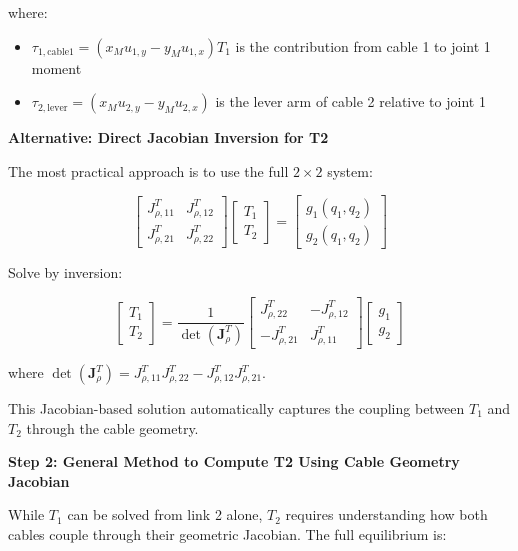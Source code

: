 where:
\begin{itemize}
    \item $\tau_{1,\text{cable1}} = (x_M u_{1,y} - y_M u_{1,x}) T_1$ is the contribution from cable 1 to joint 1 moment
    \item $\tau_{2,\text{lever}} = (x_M u_{2,y} - y_M u_{2,x})$ is the lever arm of cable 2 relative to joint 1
\end{itemize}

\textbf{Alternative: Direct Jacobian Inversion for T2}

The most practical approach is to use the full $2 \times 2$ system:

$$\begin{bmatrix} J_{\rho,11}^T & J_{\rho,12}^T \\ J_{\rho,21}^T & J_{\rho,22}^T \end{bmatrix} \begin{bmatrix} T_1 \\ T_2 \end{bmatrix} = \begin{bmatrix} g_1(q_1, q_2) \\ g_2(q_1, q_2) \end{bmatrix}$$

Solve by inversion:

\begin{equation}
\begin{bmatrix} T_1 \\ T_2 \end{bmatrix} = \frac{1}{\det(\mathbf{J}_{\rho}^T)} \begin{bmatrix} J_{\rho,22}^T & -J_{\rho,12}^T \\ -J_{\rho,21}^T & J_{\rho,11}^T \end{bmatrix} \begin{bmatrix} g_1 \\ g_2 \end{bmatrix}
\label{eq:T1T2_inversion}
\end{equation}

where $\det(\mathbf{J}_{\rho}^T) = J_{\rho,11}^T J_{\rho,22}^T - J_{\rho,12}^T J_{\rho,21}^T$.

This Jacobian-based solution automatically captures the coupling between $T_1$ and $T_2$ through the cable geometry.

\textbf{Step 2: General Method to Compute T2 Using Cable Geometry Jacobian}

While $T_1$ can be solved from link 2 alone, $T_2$ requires understanding how both cables couple through their geometric Jacobian. The full equilibrium is:

